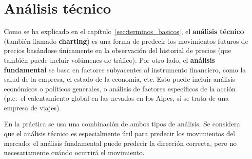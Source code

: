 
\section{Análisis técnico}
Como se ha explicado en el capítulo~\ref{sec:terminos_basicos}, el \textbf{análisis técnico} (también llamado \textbf{charting}) es una forma de predecir los movimientos futuros de precios basándose únicamente en la observación del historial de precios (que también puede incluir volúmenes de tráfico). Por otro lado, el \textbf{análisis fundamental} se basa en factores subyacentes al instrumento financiero, como la salud de la empresa, el estado de la economía, etc. Esto puede incluir análisis económicos o políticos generales, o análisis de factores específicos de la acción (p.e.\ el calentamiento global en las nevadas en los Alpes, si se trata de una empresa de viajes).

En la práctica se usa una combinación de ambos tipos de análisis. Se considera que el análisis técnico es especialmente útil para predecir los movimientos del mercado; el análisis fundamental puede predecir la dirección correcta, pero no necesariamente cuándo ocurrirá el movimiento.



